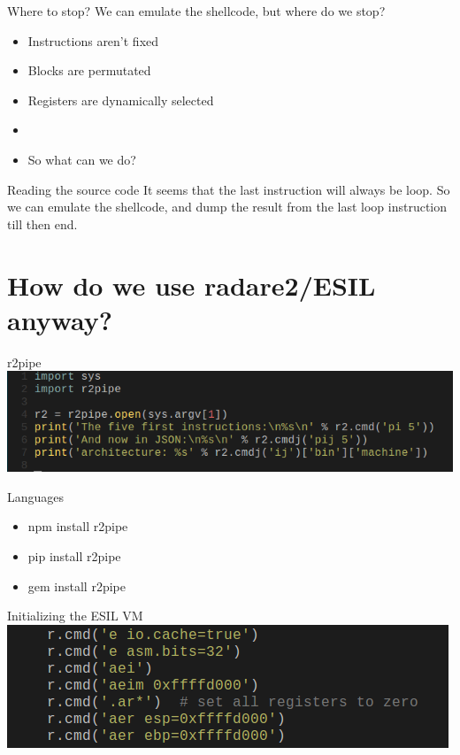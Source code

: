 \documentclass{beamer}
\begin{document}
\begin{frame}{Where to stop?}
	We can emulate the shellcode, but where do we stop?
	\begin{itemize}
		\item Instructions aren't fixed
		\item Blocks are permutated
		\item Registers are dynamically selected
		\item{}
		\item So what can we do?
	\end{itemize}
\end{frame}

\begin{frame}{Reading the source code}
	It seems that the last instruction will always be \alert{loop}.
	\newline
	\newline
	So we can emulate the shellcode, and dump the result from the last \alert{loop} instruction
	till then end.
\end{frame}

\section{How do we use radare2/ESIL anyway?}

\begin{frame}{r2pipe}
	\includegraphics[width=\textwidth]{r2pipe.png}
\end{frame}

\begin{frame}{Languages}
	\begin{itemize}
		\item npm install r2pipe
		\item pip install r2pipe
		\item gem install r2pipe
	\end{itemize}
\end{frame}

\begin{frame}{Initializing the ESIL VM}
	\includegraphics[width=\textwidth]{initmem.png}
\end{frame}
\end{document}

